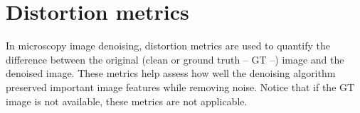 \documentclass{article}
\begin{document}






\section{Distortion metrics}

In microscopy image denoising, distortion metrics are used to quantify
the difference between the original (clean or ground truth -- GT --)
image and the denoised image. These metrics help assess how well the
denoising algorithm preserved important image features while removing
noise. Notice that if the GT image is not available, these metrics are
not applicable.
\end{document}
